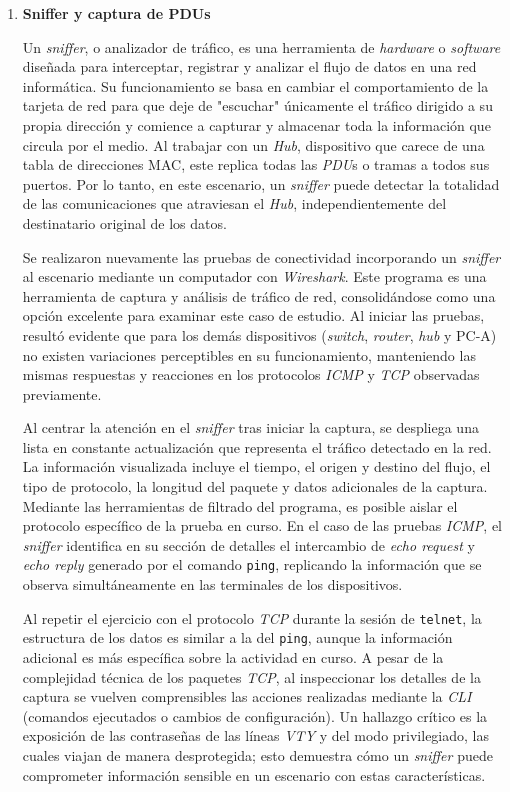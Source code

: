 \begin{enumerate}[resume=labsteps]

\item \textbf{Sniffer y captura de PDUs}


Un \textit{sniffer}, o analizador de tráfico, es una herramienta de \textit{hardware} 
o \textit{software} diseñada para interceptar, registrar y analizar el flujo de datos 
en una red informática. Su funcionamiento se basa en cambiar el comportamiento de la 
tarjeta de red para que deje de "escuchar" únicamente el tráfico dirigido a su propia 
dirección y comience a capturar y almacenar toda la información que circula por el medio. 
Al trabajar con un \textit{Hub}, dispositivo que carece de una tabla de direcciones MAC, 
este replica todas las \textit{PDU}s o tramas a todos sus puertos. Por lo tanto, en este 
escenario, un \textit{sniffer} puede detectar la totalidad de las comunicaciones que atraviesan 
el \textit{Hub}, independientemente del destinatario original de los datos.

Se realizaron nuevamente las pruebas de conectividad incorporando un \textit{sniffer} al 
escenario mediante un computador con \textit{Wireshark}. Este programa es una herramienta 
de captura y análisis de tráfico de red, consolidándose como una opción excelente para 
examinar este caso de estudio. Al iniciar las pruebas, resultó evidente que para los demás 
dispositivos (\textit{switch}, \textit{router}, \textit{hub} y PC-A) no existen variaciones 
perceptibles en su funcionamiento, manteniendo las mismas respuestas y reacciones en los 
protocolos \textit{ICMP} y \textit{TCP} observadas previamente.

Al centrar la atención en el \textit{sniffer} tras iniciar la captura, se despliega una lista 
en constante actualización que representa el tráfico detectado en la red. La información visualizada 
incluye el tiempo, el origen y destino del flujo, el tipo de protocolo, la longitud del paquete y datos 
adicionales de la captura. Mediante las herramientas de filtrado del programa, es posible aislar el protocolo 
específico de la prueba en curso. En el caso de las pruebas \textit{ICMP}, el \textit{sniffer} identifica en su 
sección de detalles el intercambio de \textit{echo request} y \textit{echo reply} generado por el comando 
\texttt{ping}, replicando la información que se observa simultáneamente en las terminales de los dispositivos.

Al repetir el ejercicio con el protocolo \textit{TCP} durante la sesión de \texttt{telnet}, la estructura de 
los datos es similar a la del \texttt{ping}, aunque la información adicional es más específica sobre la actividad 
en curso. A pesar de la complejidad técnica de los paquetes \textit{TCP}, al inspeccionar los detalles de la captura 
se vuelven comprensibles las acciones realizadas mediante la \textit{CLI} (comandos ejecutados o cambios de configuración). 
Un hallazgo crítico es la exposición de las contraseñas de las líneas \textit{VTY} y del modo privilegiado, las cuales viajan 
de manera desprotegida; esto demuestra cómo un \textit{sniffer} puede comprometer información sensible en un escenario con estas 
características.


\end{enumerate}
